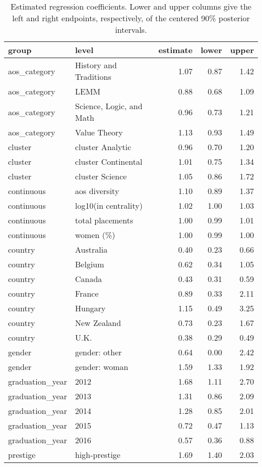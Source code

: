 \begin{table}

\caption{\label{tab:estimates}Estimated regression coefficients.  Lower and upper columns give the left and right endpoints, respectively, of the centered 90\% posterior intervals.}
\centering
\begin{tabular}[t]{llrrr}
\toprule
group & level & estimate & lower & upper\\
\midrule
aos\_category & History and Traditions & 1.07 & 0.87 & 1.42\\
aos\_category & LEMM & 0.88 & 0.68 & 1.09\\
aos\_category & Science, Logic, and Math & 0.96 & 0.73 & 1.21\\
aos\_category & Value Theory & 1.13 & 0.93 & 1.49\\
cluster & cluster Analytic & 0.96 & 0.70 & 1.20\\
\addlinespace
cluster & cluster Continental & 1.01 & 0.75 & 1.34\\
cluster & cluster Science & 1.05 & 0.86 & 1.72\\
continuous & aos diversity & 1.10 & 0.89 & 1.37\\
continuous & log10(in centrality) & 1.02 & 1.00 & 1.03\\
continuous & total placements & 1.00 & 0.99 & 1.01\\
\addlinespace
continuous & women (\%) & 1.00 & 0.99 & 1.00\\
country & Australia & 0.40 & 0.23 & 0.66\\
country & Belgium & 0.62 & 0.34 & 1.05\\
country & Canada & 0.43 & 0.31 & 0.59\\
country & France & 0.89 & 0.33 & 2.11\\
\addlinespace
country & Hungary & 1.15 & 0.49 & 3.25\\
country & New Zealand & 0.73 & 0.23 & 1.67\\
country & U.K. & 0.38 & 0.29 & 0.49\\
gender & gender: other & 0.64 & 0.00 & 2.42\\
gender & gender: woman & 1.59 & 1.33 & 1.92\\
\addlinespace
graduation\_year & 2012 & 1.68 & 1.11 & 2.70\\
graduation\_year & 2013 & 1.31 & 0.86 & 2.09\\
graduation\_year & 2014 & 1.28 & 0.85 & 2.01\\
graduation\_year & 2015 & 0.72 & 0.47 & 1.13\\
graduation\_year & 2016 & 0.57 & 0.36 & 0.88\\
\addlinespace
prestige & high-prestige & 1.69 & 1.40 & 2.03\\
\bottomrule
\end{tabular}
\end{table}